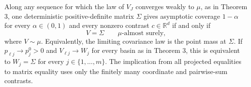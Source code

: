 Along any sequence for which the law of \(V_J\) converges weakly to \(\mu\), as in Theorem 3, one deterministic positive-definite matrix \(\Sigma\) gives asymptotic coverage \(1-\alpha\) for every \(\alpha\in(0,1)\) and every nonzero contrast \(c\in\mathbb R^d\) if and only if
\[
 V=\Sigma\qquad\mu\text{-almost surely},
\]
where \(V\sim\mu\). Equivalently, the limiting covariance law is the point mass at \(\Sigma\). If \(p_{\ell j}\to p_j^0>0\) and \(V_{\ell j}\to W_j\) for every basin as in Theorem 3, this is equivalent to \(W_j=\Sigma\) for every \(j\in\{1,\ldots,m\}\). The implication from all projected equalities to matrix equality uses only the finitely many coordinate and pairwise-sum contrasts.